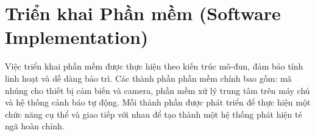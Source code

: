 \section{Triển khai Phần mềm (Software Implementation)}
\label{sec:software_implementation}

Việc triển khai phần mềm được thực hiện theo kiến trúc mô-đun, đảm bảo tính linh hoạt và dễ dàng bảo trì. Các thành phần phần mềm chính bao gồm: mã nhúng cho thiết bị cảm biến và camera, phần mềm xử lý trung tâm trên máy chủ và hệ thống cảnh báo tự động. Mỗi thành phần được phát triển để thực hiện một chức năng cụ thể và giao tiếp với nhau để tạo thành một hệ thống phát hiện té ngã hoàn chỉnh.





